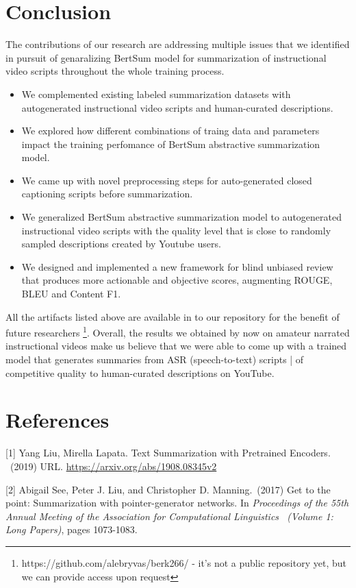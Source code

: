 \documentclass{article}
\begin{document}
\section{Conclusion}

The contributions of our research are addressing multiple issues that we identified in pursuit of genaralizing BertSum model for summarization of instructional video scripts throughout the whole training process. 

\begin{itemize}

\item We complemented existing labeled summarization datasets with autogenerated instructional video scripts and human-curated descriptions. 
\item We explored how different combinations of traing data and parameters  impact the training perfomance  of BertSum abstractive summarization model.
\item We came up with novel preprocessing steps for auto-generated closed captioning scripts before summarization.
\item We generalized BertSum abstractive summarization model to autogenerated instructional video scripts with the quality level that is close to randomly sampled descriptions created by Youtube users.
\item We designed and implemented a new framework for blind unbiased review that produces more actionable and objective scores,  augmenting ROUGE, BLEU and Content F1.
\end{itemize}
 
All the artifacts listed above are available  in to our repository for the benefit of future researchers \footnote{https://github.com/alebryvas/berk266/ - it's not a public repository yet, but we can provide access upon request}. Overall, the results we obtained by now on amateur narrated instructional videos  make us believe that we were able to come up with a trained model  that generates summaries from ASR (speech-to-text) scripts | of competitive quality to human-curated descriptions on YouTube. 

\section*{References} 

[1] Yang Liu, Mirella Lapata. Text Summarization with Pretrained Encoders.  \ (2019) URL. \url{https://arxiv.org/abs/1908.08345v2}

[2] Abigail See, Peter J. Liu, and Christopher D. Manning.\ (2017) Get to the point: Summarization with pointer-generator networks. In {\it Proceedings of the 55th Annual Meeting of the Association for Computational Linguistics \ (Volume 1: Long Papers)}, pages 1073-1083.
\end{document}
